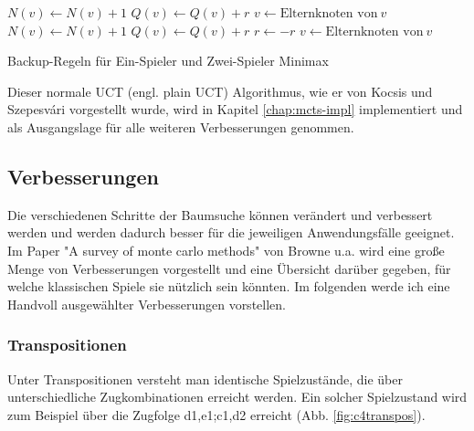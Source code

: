 \begin{algorithm}[H]
\begin{algorithmic}		
 
		\State $N(v) \gets N(v) + 1$
		\State $Q(v) \gets Q(v) + r$
		\State $v \gets \text{Elternknoten von}\ v$
	\EndWhile
\EndFunction\\

 
		\State $N(v) \gets N(v) + 1$
		\State $Q(v) \gets Q(v) + r$
		\State $r \gets -r$
		\State $v \gets \text{Elternknoten von}\ v$
	\EndWhile
\EndFunction
\end{algorithmic}
\caption{Backup-Regeln für Ein-Spieler und Zwei-Spieler Minimax}
\end{algorithm}

Dieser normale UCT (engl. plain UCT) Algorithmus, wie er von Kocsis und Szepesv\'{a}ri vorgestellt wurde, wird in Kapitel \ref{chap:mcts-impl} implementiert und als Ausgangslage für alle weiteren Verbesserungen genommen. 

\subsection{Verbesserungen}

Die verschiedenen Schritte der Baumsuche können verändert und verbessert werden und werden dadurch besser für die jeweiligen Anwendungsfälle geeignet. Im Paper "A survey of monte carlo methods" von Browne u.a.\autocite{browneSurveyMonteCarlo2012} wird eine große Menge von Verbesserungen vorgestellt und eine Übersicht darüber gegeben, für welche klassischen Spiele sie nützlich sein könnten. Im folgenden werde ich eine Handvoll ausgewählter Verbesserungen vorstellen.

\subsubsection{Transpositionen}
\label{transpos}
Unter Transpositionen versteht man identische Spielzustände, die über unterschiedliche Zugkombinationen erreicht werden. Ein solcher Spielzustand wird zum Beispiel über die Zugfolge d1,e1;c1,d2 erreicht (Abb. \ref{fig:c4transpos}).


